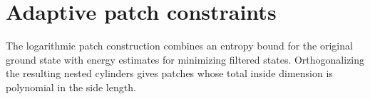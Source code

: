 \section{Adaptive patch constraints}
\label{sec:peps_adaptive_patch_construction}
The logarithmic patch construction combines an entropy bound for the original
ground state with energy estimates for minimizing filtered states. Orthogonalizing
the resulting nested cylinders gives patches whose total inside dimension is
polynomial in the side length.












